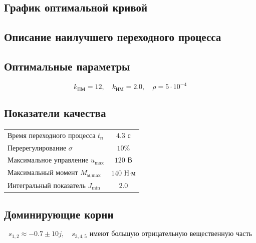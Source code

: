 \documentclass[14pt]{extreport}
\begin{document}
{\subsection*{График оптимальной кривой}
\begin{center}
\end{center}

        \subsection{Описание наилучшего переходного процесса}
        \subsection*{Оптимальные параметры}
\[
k_{\text{ПМ}} = 12, \quad k_{\text{ИМ}} = 2.0, \quad \rho = 5 \cdot 10^{-4}
\]

\subsection*{Показатели качества}
\begin{table}[h]
\centering
\begin{tabular}{|l|c|}
\hline
Время переходного процесса $t_{\text{п}}$ & $4.3$ с \\
Перерегулирование $\sigma$ & $10\%$ \\
Максимальное управление $u_{\text{max}}$ & $120$ В \\
Максимальный момент $M_{\text{м,max}}$ & $140$ Н$\cdot$м \\
Интегральный показатель $J_{\min}$ & $2.0$ \\
\hline
\end{tabular}
\end{table}

\subsection*{Доминирующие корни}
\[
s_{1,2} \approx -0.7 \pm 10j, \quad s_{3,4,5} \text{ имеют большую отрицательную вещественную часть}
\]

}
\end{document}
